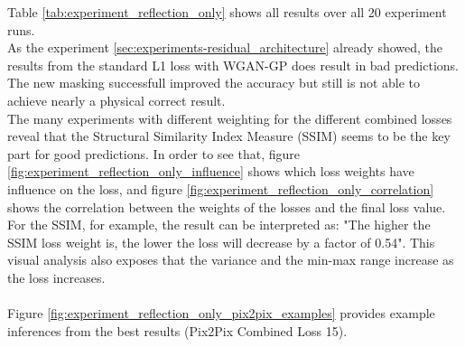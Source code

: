 		
		
		Table \ref{tab:experiment_reflection_only} shows all results over all 20 experiment runs.\\
		As the experiment \ref{sec:experiments-residual_architecture} already showed, the results from the standard L1 loss with WGAN-GP does result in bad predictions. The new masking successfull improved the accuracy but still is not able to achieve nearly a physical correct result.\\
		The many experiments with different weighting for the different combined losses reveal that the Structural Similarity Index Measure (SSIM) seems to be the key part for good predictions. In order to see that, figure \ref{fig:experiment_reflection_only_influence} shows which loss weights have influence on the loss, and figure \ref{fig:experiment_reflection_only_correlation} shows the correlation between the weights of the losses and the final loss value. For the SSIM, for example, the result can be interpreted as: "The higher the SSIM loss weight is, the lower the loss will decrease by a factor of 0.54". This visual analysis also exposes that the variance and the min-max range increase as the loss increases.\\
		\\
		Figure \ref{fig:experiment_reflection_only_pix2pix_examples} provides example inferences from the best results (Pix2Pix Combined Loss 15).
		
